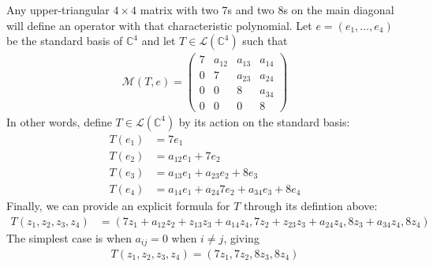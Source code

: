 \documentclass[12pt]{article}
\begin{document}
\noindent Any upper-triangular $4\times4$ matrix with two $7$s and two $8$s on the main diagonal will define an operator with that characteristic polynomial.  Let $e = (e_1, \dots, e_4)$ be the standard basis of $\mathbb{C}^4$ and let $T \in \mathcal{L}(\mathbb{C}^4)$ such that
\begin{align*}
	\mathcal{M}(T, e) = \left(\begin{array}{cccc}
		7 & a_{12} & a_{13} & a_{14} \\
		0 & 7 & a_{23} & a_{24} \\
		0 & 0 & 8 & a_{34} \\
		0 & 0 & 0 & 8
	\end{array}\right)
\end{align*}
In other words, define $T \in \mathcal{L}(\mathbb{C}^4)$ by its action on the standard basis:
\begin{align*}
	T(e_1) &= 7e_1 \\
	T(e_2) &= a_{12}e_1 + 7e_2 \\
	T(e_3) &= a_{13}e_1 + a_{23}e_2 + 8e_3 \\
	T(e_4) &= a_{14}e_1 + a_{24}7e_2 + a_{34}e_3 + 8e_4
\end{align*}
Finally, we can provide an explicit formula for $T$ through its defintion above:
\begin{align*}
	T(z_1, z_2, z_3, z_4) &= (7z_1 + a_{12}z_2 + z_{13}z_3 + a_{14}z_4, 7z_2 + z_{23}z_3 + a_{24}z_4, 8z_3 + a_{34}z_4, 8z_4)
\end{align*}
The simplest case is when $a_{ij} = 0$ when $i \neq j$, giving
\begin{align*}
	T(z_1, z_2, z_3, z_4) = (7z_1, 7z_2, 8z_3, 8z_4)
\end{align*}
\end{document}
